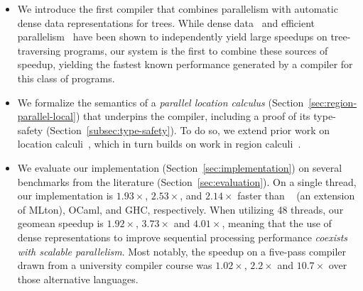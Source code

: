 \documentclass[acmsmall,acmthm=false,nonacm]{acmart}
\theoremstyle{straighttext0}
\theoremstyle{straighttext}
\newcommand{\Secref}[1]{Section~\ref{#1}}
\begin{document}
\begin{itemize}  
\item We introduce the first compiler that combines parallelism with automatic dense data
  representations for trees. While dense data~\cite{LoCal} and
  efficient parallelism~\cite{MPL,icfp-hierarchical-heaps} have been shown to independently yield large
  speedups on tree-traversing programs, our system is the first to combine
  these sources of speedup, yielding the fastest known performance generated by
  a compiler for this class of programs.

\item We formalize the semantics of a {\em parallel location calculus}
  (\Secref{sec:region-parallel-local}) that underpins the compiler, 
  including a proof of its type-safety (\Secref{subsec:type-safety}).
  To do so, we extend prior work on location calculi~\cite{LoCal},
  which in turn builds on work in region calculi~\cite{regioncalcs}.

\item We evaluate our implementation (\Secref{sec:implementation})
  on several benchmarks
  from the literature (\Secref{sec:evaluation}).
  On a single thread, our implementation is
  $1.93\times$, $2.53\times$, and $2.14\times$
  faster than \MPL{}~\cite{MPL} (an extension of MLton),
  OCaml, and GHC, respectively.
  When utilizing 48 threads, our geomean speedup is
  $1.92\times$, $3.73\times$ and $4.01\times$,
  meaning that the use of dense
  representations to improve sequential processing performance
  {\em coexists with scalable parallelism}.
  Most notably, the speedup on a five-pass compiler drawn from a university
  compiler course was $1.02\times$, $2.2\times$ and $10.7\times$ over those alternative
  languages.
  
\end{itemize}

\end{document}
